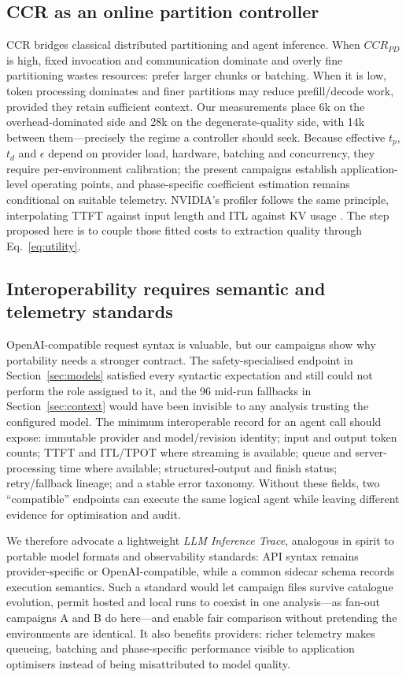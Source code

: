 \documentclass[conference]{IEEEtran}
\begin{document}
\subsection{CCR as an online partition controller}
CCR bridges classical distributed partitioning and agent inference. When $CCR_{PD}$ is high, fixed invocation and communication dominate and overly fine partitioning wastes resources: prefer larger chunks or batching. When it is low, token processing dominates and finer partitions may reduce prefill/decode work, provided they retain sufficient context. Our measurements place 6k on the overhead-dominated side and 28k on the degenerate-quality side, with 14k between them---precisely the regime a controller should seek. Because effective $t_p$, $t_d$ and $\epsilon$ depend on provider load, hardware, batching and concurrency, they require per-environment calibration; the present campaigns establish application-level operating points, and phase-specific coefficient estimation remains conditional on suitable telemetry. NVIDIA's profiler follows the same principle, interpolating TTFT against input length and ITL against KV usage \cite{nvidiaDynamoProfiler}. The step proposed here is to couple those fitted costs to extraction quality through Eq.~\ref{eq:utility}.

\subsection{Interoperability requires semantic and telemetry standards}
OpenAI-compatible request syntax is valuable, but our campaigns show why portability needs a stronger contract. The safety-specialised endpoint in Section~\ref{sec:models} satisfied every syntactic expectation and still could not perform the role assigned to it, and the 96 mid-run fallbacks in Section~\ref{sec:context} would have been invisible to any analysis trusting the configured model. The minimum interoperable record for an agent call should expose: immutable provider and model/revision identity; input and output token counts; TTFT and ITL/TPOT where streaming is available; queue and server-processing time where available; structured-output and finish status; retry/fallback lineage; and a stable error taxonomy. Without these fields, two ``compatible'' endpoints can execute the same logical agent while leaving different evidence for optimisation and audit.

We therefore advocate a lightweight \emph{LLM Inference Trace}, analogous in spirit to portable model formats and observability standards: API syntax remains provider-specific or OpenAI-compatible, while a common sidecar schema records execution semantics. Such a standard would let campaign files survive catalogue evolution, permit hosted and local runs to coexist in one analysis---as fan-out campaigns A and B do here---and enable fair comparison without pretending the environments are identical. It also benefits providers: richer telemetry makes queueing, batching and phase-specific performance visible to application optimisers instead of being misattributed to model quality.
\end{document}

